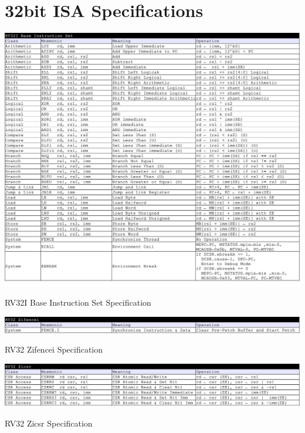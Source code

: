 \section{32bit ISA Specifications}

\begin{table}[H]
    \includegraphics[width=1.00\columnwidth]{./Table/ISASpec_RV32I.png}
    \caption{RV32I Base Instruction Set Specification}
    \label{tb:ISASpec_RV32I}
\end{table}

\begin{table}[H]
    \includegraphics[width=1.00\columnwidth]{./Table/ISASpec_RV32Zifencei.png}
    \caption{RV32 Zifencei Specification}
    \label{tb:ISASpec_RV32Zifencei}
\end{table}

\begin{table}[H]
    \includegraphics[width=1.00\columnwidth]{./Table/ISASpec_RV32Zicsr.png}
    \caption{RV32 Zicsr Specification}
    \label{tb:ISASpec_RV32Zicsr}
\end{table}

